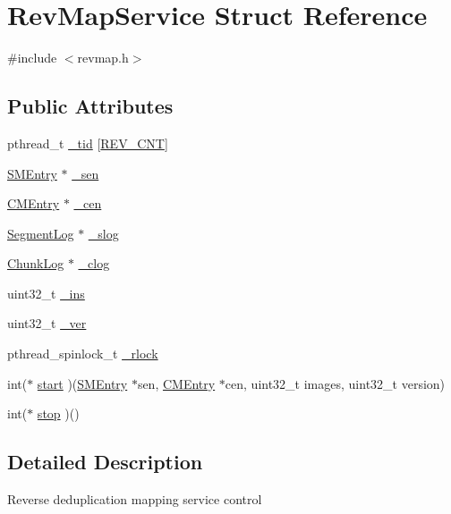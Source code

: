 \hypertarget{structRevMapService}{\section{\-Rev\-Map\-Service \-Struct \-Reference}
\label{structRevMapService}
}


{\ttfamily \#include $<$revmap.\-h$>$}

\subsection*{\-Public \-Attributes}
\begin{DoxyCompactItemize}
\item 
pthread\-\_\-t \hyperlink{structRevMapService_ab2e0ab405280b6b2a6583726274a78eb}{\-\_\-tid} \mbox{[}\hyperlink{revdedup_8h_a7c4a19f561ae530b98cd1cf1794c6988}{\-R\-E\-V\-\_\-\-C\-N\-T}\mbox{]}
\item 
\hyperlink{structSMEntry}{\-S\-M\-Entry} $\ast$ \hyperlink{structRevMapService_ace492c5fabb9a24cc635bb89e45294e4}{\-\_\-sen}
\item 
\hyperlink{structCMEntry}{\-C\-M\-Entry} $\ast$ \hyperlink{structRevMapService_a5af0b72f8ba84b926b568bc9c38d186a}{\-\_\-cen}
\item 
\hyperlink{structSegmentLog}{\-Segment\-Log} $\ast$ \hyperlink{structRevMapService_af43b4b29bb7335be430bc345604748f0}{\-\_\-slog}
\item 
\hyperlink{structChunkLog}{\-Chunk\-Log} $\ast$ \hyperlink{structRevMapService_a6af1ae688052a7daca84586ffae50bc6}{\-\_\-clog}
\item 
uint32\-\_\-t \hyperlink{structRevMapService_ab0a99b750f57f7ac7b548b1f2729cea2}{\-\_\-ins}
\item 
uint32\-\_\-t \hyperlink{structRevMapService_a106b5aaf39bcd26f0f12cf1edbd236dc}{\-\_\-ver}
\item 
pthread\-\_\-spinlock\-\_\-t \hyperlink{structRevMapService_adfd1317c2bab22193cde446c3007d954}{\-\_\-rlock}
\item 
int($\ast$ \hyperlink{structRevMapService_a2298bb6652683973048fd4251b0c632e}{start} )(\hyperlink{structSMEntry}{\-S\-M\-Entry} $\ast$sen, \hyperlink{structCMEntry}{\-C\-M\-Entry} $\ast$cen, uint32\-\_\-t images, uint32\-\_\-t version)
\item 
int($\ast$ \hyperlink{structRevMapService_a3bd47d541130d571de99248bb1e37fb0}{stop} )()
\end{DoxyCompactItemize}


\subsection{\-Detailed \-Description}
\-Reverse deduplication mapping service control 


